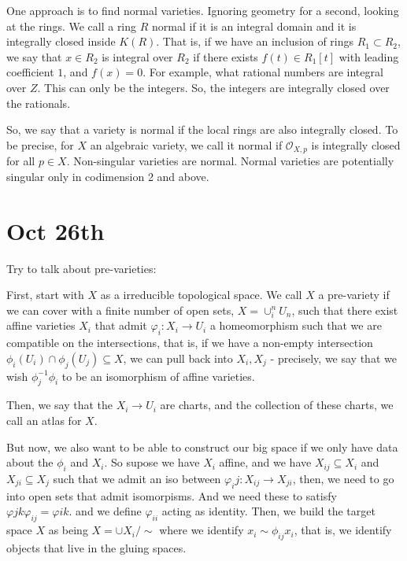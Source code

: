 \documentclass[10pt]{article}
\begin{document}
One approach is to find normal varieties. Ignoring geometry for a second, looking at the rings. We call a ring $R$ normal if it is an integral domain and it is integrally closed inside $K(R)$. That is, if we have an inclusion of rings $R_1 \subset R_2$, we say that $x \in R_2$ is integral over $R_2$ if there exists $f(t)  \in R_1[t]$ with leading coefficient $1$, and $f(x) = 0$. For example, what rational numbers are integral over $Z$. This can only be the integers. So, the integers are integrally closed over the rationals. 

So, we say that a variety is normal if the local rings are also integrally closed. To be precise, for $X$ an algebraic variety, we call it normal if $\mathcal{O}_{X,p}$ is integrally closed for all $p \in X$. Non-singular varieties are normal. Normal varieties are potentially singular only in codimension 2 and above.

\section{Oct 26th}

Try to talk about pre-varieties:

First, start with $X$ as a irreducible topological space. We call $X$ a pre-variety if we can cover with a finite number of open sets, $X = \cup_i^n U_n$, such that there exist affine varieties $X_i$ that admit $\varphi_i: X_i \to U_i$ a homeomorphism such that we are compatible on the intersections, that is, if we have a non-empty intersection $\phi_i(U_i) \cap \phi_j(U_j) \subseteq X$, we can pull back into $X_i, X_j$  - precisely, we say that we wish $\phi_j^{-1} \phi_i$ to be an isomorphism of affine varieties.

Then, we say that the $X_i \to U_i$ are charts, and the collection of these charts, we call an atlas for $X$.

But now, we also want to be able to construct our big space if we only have data about the $\phi_i$ and $X_i$. So supose we have $X_i$ affine, and we have $X_{ij} \subseteq X_i$ and $X_{ji} \subseteq X_j$ such that we admit an iso between $\varphi_ij: X_{ij} \to  X_{ji}$, then, we need to go into open sets that admit isomorpisms. And we need these to satisfy $\varphi{jk}\varphi_{ij} = \varphi{ik}$. and we define $\varphi_{ii}$ acting as identity. Then, we build the target space $X$ as being $X = \cup X_i / \sim$ where we identify $x_i \sim \phi_{ij} x_i$, that is, we identify objects that live in the gluing spaces.  
\end{document}
